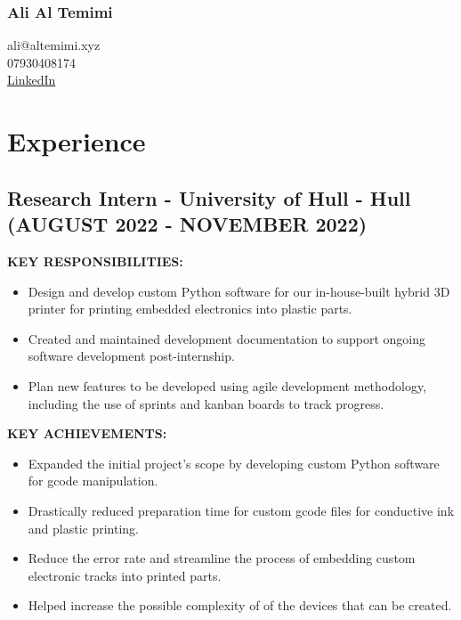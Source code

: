 \documentclass{article}
\begin{document}
\begin{multicols}{2}
    \subsubsection{Ali Al Temimi}
    \columnbreak
    \Large\raggedleft ali@altemimi.xyz \\ 07930408174 \\ \href{https://www.linkedin.com/in/ali-al-temimi-8995b4196/}{LinkedIn}
    \noindent
\end{multicols}

\section{Experience}
\subsection{Research Intern - \textnormal{University of Hull - Hull} \footnotesize{(AUGUST 2022 - NOVEMBER 2022)}}
\begin{minipage}[t]{1\textwidth}
    \footnotesize{\textbf{KEY RESPONSIBILITIES:}}
    \normalsize{}
    \begin{itemize}[leftmargin=*]
        \item Design and develop custom Python software for our in-house-built hybrid 3D printer for printing embedded electronics into plastic parts. 
        \item Created and maintained development documentation to support ongoing software development post-internship.
        \item Plan new features to be developed using agile development methodology, including the use of sprints and kanban boards to track progress.
    \end{itemize}
\end{minipage}
\begin{minipage}[t]{1\textwidth}
    \vspace{1em}
    \footnotesize{\textbf{KEY ACHIEVEMENTS:}}
    \normalsize{}
    \begin{itemize}[leftmargin=*]
        \item Expanded the initial project’s scope by developing custom Python software for gcode manipulation.
        \item Drastically reduced preparation time for custom gcode files for conductive ink and plastic printing.
        \item Reduce the error rate and streamline the process of embedding custom electronic tracks into printed parts. 
        \item Helped increase the possible complexity of of the devices that can be created.  
    \end{itemize}
\end{minipage}
\end{document}
